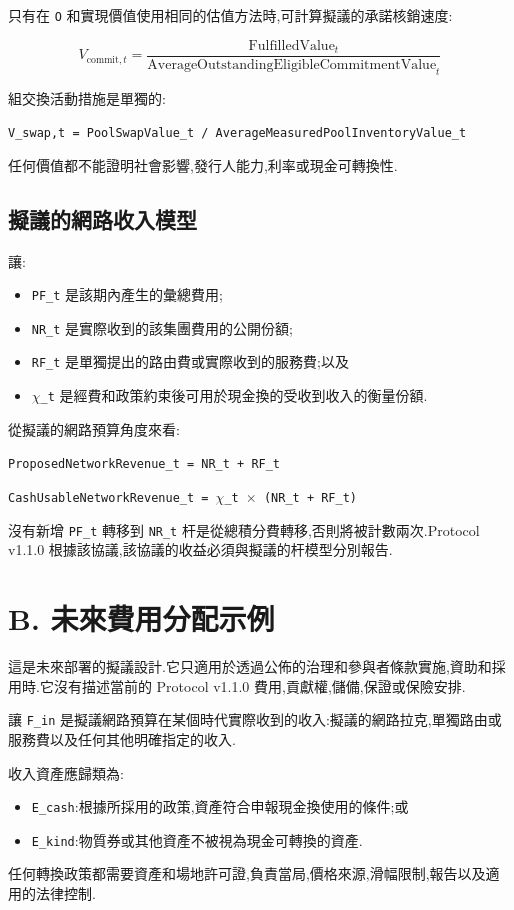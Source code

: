 \documentclass[11pt]{article}
\begin{document}
只有在 \texttt{O} 和實現價值使用相同的估值方法時,可計算擬議的承諾核銷速度:

\[
V_{\mathrm{commit},t} = \frac{\mathrm{FulfilledValue}_t}{\mathrm{AverageOutstandingEligibleCommitmentValue}_t}
\]

組交換活動措施是單獨的:

\texttt{V\_swap,t = PoolSwapValue\_t / AverageMeasuredPoolInventoryValue\_t}

任何價值都不能證明社會影響,發行人能力,利率或現金可轉換性.

\subsection*{擬議的網路收入模型}

讓:

\begin{itemize}[leftmargin=*]
\item \texttt{PF\_t} 是該期內產生的彙總費用;
\item \texttt{NR\_t} 是實際收到的該集團費用的公開份額;
\item \texttt{RF\_t} 是單獨提出的路由費或實際收到的服務費;以及
\item \texttt{$\chi$\_t} 是經費和政策約束後可用於現金換的受收到收入的衡量份額.
\end{itemize}
從擬議的網路預算角度來看:

\texttt{ProposedNetworkRevenue\_t = NR\_t + RF\_t}

\texttt{CashUsableNetworkRevenue\_t = $\chi$\_t $\times$ (NR\_t + RF\_t)}

沒有新增 \texttt{PF\_t} 轉移到 \texttt{NR\_t} 杆是從總積分費轉移,否則將被計數兩次.Protocol v1.1.0 根據該協議,該協議的收益必須與擬議的杆模型分別報告.


\section*{B. 未來費用分配示例}

這是未來部署的擬議設計.它只適用於透過公佈的治理和參與者條款實施,資助和採用時.它沒有描述當前的 Protocol v1.1.0 費用,貢獻權,儲備,保證或保險安排.

讓 \texttt{F\_in} 是擬議網路預算在某個時代實際收到的收入:擬議的網路拉克,單獨路由或服務費以及任何其他明確指定的收入.

收入資產應歸類為:

\begin{itemize}[leftmargin=*]
\item \texttt{E\_cash}:根據所採用的政策,資產符合申報現金換使用的條件;或
\item \texttt{E\_kind}:物質券或其他資產不被視為現金可轉換的資產.
\end{itemize}
任何轉換政策都需要資產和場地許可證,負責當局,價格來源,滑幅限制,報告以及適用的法律控制.
\end{document}
